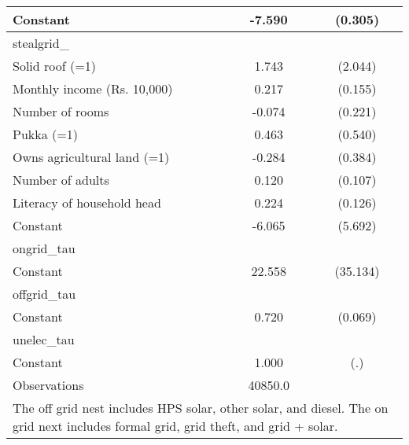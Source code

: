 \begin{table}[htbp]
\begin{tabular}{l*{1}{cc}}
Constant            &      -7.590\sym{***}&     (0.305)\\
\midrule
stealgrid\_          &                     &            \\
Solid roof (=1)     &       1.743         &     (2.044)\\
Monthly income (Rs. 10,000)&       0.217         &     (0.155)\\
Number of rooms     &      -0.074         &     (0.221)\\
Pukka (=1)          &       0.463         &     (0.540)\\
Owns agricultural land (=1)&      -0.284         &     (0.384)\\
Number of adults    &       0.120         &     (0.107)\\
Literacy of household head&       0.224\sym{*}  &     (0.126)\\
Constant            &      -6.065         &     (5.692)\\
\midrule
ongrid\_tau          &                     &            \\
Constant            &      22.558         &    (35.134)\\
\midrule
offgrid\_tau         &                     &            \\
Constant            &       0.720\sym{***}&     (0.069)\\
\midrule
unelec\_tau          &                     &            \\
Constant            &       1.000         &         (.)\\
\midrule
Observations        &     40850.0         &            \\
\bottomrule
\multicolumn{3}{l}{\footnotesize The off grid nest includes HPS solar, other solar, and diesel.                 The on grid next includes formal grid, grid theft, and grid + solar.}\\
\end{tabular}
\end{table}
